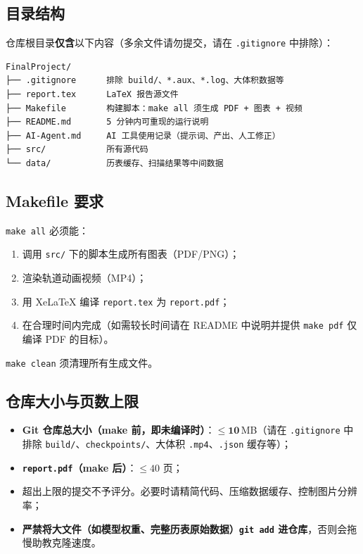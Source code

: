 \documentclass[11pt,a4paper]{ctexart}
\begin{document}
\subsection{目录结构}

仓库根目录\textbf{仅含}以下内容（多余文件请勿提交，请在 \texttt{.gitignore} 中排除）：

\begin{lstlisting}[basicstyle=\ttfamily\footnotesize]
FinalProject/
├── .gitignore      排除 build/、*.aux、*.log、大体积数据等
├── report.tex      LaTeX 报告源文件
├── Makefile        构建脚本：make all 须生成 PDF + 图表 + 视频
├── README.md       5 分钟内可重现的运行说明
├── AI-Agent.md     AI 工具使用记录（提示词、产出、人工修正）
├── src/            所有源代码
└── data/           历表缓存、扫描结果等中间数据
\end{lstlisting}

\subsection{Makefile 要求}

\texttt{make all} 必须能：

\begin{enumerate}[leftmargin=*]
    \item 调用 \texttt{src/} 下的脚本生成所有图表（PDF/PNG）；
    \item 渲染轨道动画视频（MP4）；
    \item 用 XeLaTeX 编译 \texttt{report.tex} 为 \texttt{report.pdf}；
    \item 在合理时间内完成（如需较长时间请在 README 中说明并提供 \texttt{make pdf} 仅编译 PDF 的目标）。
\end{enumerate}

\texttt{make clean} 须清理所有生成文件。

\subsection{仓库大小与页数上限}

\begin{itemize}[leftmargin=*]
    \item \textbf{Git 仓库总大小（make 前，即未编译时）}：$\le \mathbf{10}$\,MB（请在 \texttt{.gitignore} 中排除 \texttt{build/}、\texttt{checkpoints/}、大体积 \texttt{.mp4}、\texttt{.json} 缓存等）；
    \item \textbf{\texttt{report.pdf}（make 后）}：$\le 40$ 页；
    \item 超出上限的提交不予评分。必要时请精简代码、压缩数据缓存、控制图片分辨率；
    \item \textbf{严禁将大文件（如模型权重、完整历表原始数据）\texttt{git add} 进仓库}，否则会拖慢助教克隆速度。
\end{itemize}
\end{document}
